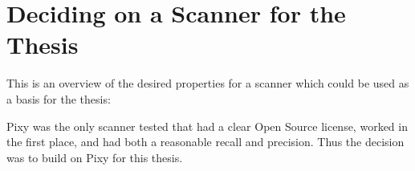 \section{Deciding on a Scanner for the Thesis}

This is an overview of the desired properties for a scanner which could be used as a basis for the thesis:


Pixy was the only scanner tested that had a clear Open Source license, worked in the first place, and had both a reasonable recall and precision. Thus the decision was to build on Pixy for this thesis.
